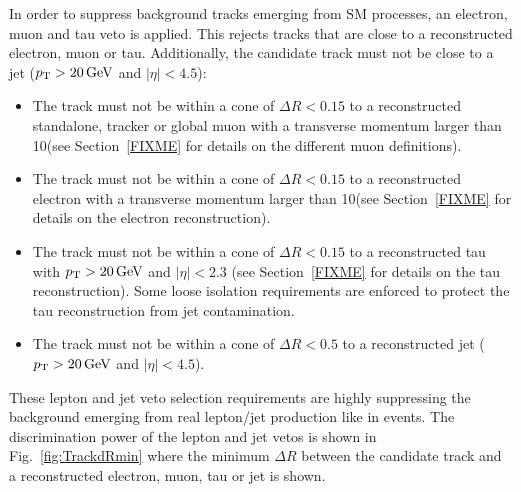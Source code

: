 In order to suppress background tracks emerging from SM processes, an electron, muon and tau veto is applied.
This rejects tracks that are close to a reconstructed electron, muon or tau.
Additionally, the candidate track must not be close to a jet ($p_{\text{T}}>20\,\text{Ge}\kern-0.06667em\text{V}$ and $|\eta|<4.5$):
\begin{itemize}
\renewcommand{\labelitemi}{\footnotesize{\ding{118}}}
\item The track must not be within a cone of $\Delta R<0.15$ to a reconstructed standalone, tracker or global muon with a transverse momentum larger than 10\gev (see Section~\ref{FIXME} for details on the different muon definitions).
\item The track must not be within a cone of $\Delta R<0.15$ to a reconstructed electron with a transverse momentum larger than 10\gev (see Section~\ref{FIXME} for details on the electron reconstruction).
\item The track must not be within a cone of $\Delta R<0.15$ to a reconstructed tau with $p_{\text{T}}>20\,\text{Ge}\kern-0.06667em\text{V}$ and $|\eta|<2.3$ (see Section~\ref{FIXME} for details on the tau reconstruction). 
      Some loose isolation requirements are enforced to protect the tau reconstruction from jet contamination.
\item The track must not be within a cone of $\Delta R< 0.5$ to a reconstructed jet ($p_{\text{T}}>20\,\text{Ge}\kern-0.06667em\text{V}$ and $|\eta|<4.5$).\\
\end{itemize}
These lepton and jet veto selection requirements are highly suppressing the background emerging from real lepton/jet production like in \WJets events.
The discrimination power of the lepton and jet vetos is shown in Fig.~\ref{fig:TrackdRmin} where the minimum $\Delta R$ between the candidate track and a reconstructed electron, muon, tau or jet is shown.\\
